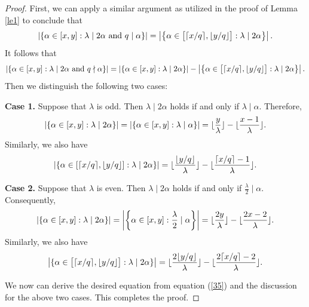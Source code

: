 \documentclass[10pt,a4paper]{amsart}
\begin{document}
\begin{proof}
First, we can apply a similar argument as utilized in the proof of Lemma \ref{le1} to conclude that 
    \begin{equation}\notag
   \left|  \{\alpha\in [x,y]:\lambda\mid 2\alpha \hbox{ and }q\mid \alpha \}\right|=\left| \left\{\alpha\in \big[\lceil {x}/{q}\rceil,\lfloor {y}/{q}\rfloor\big]: \lambda\mid 2\alpha\right\}\right|.
 \end{equation}
It follows that 
\begin{equation}\label{35}
    \left|  \{\alpha\in [x,y]:\lambda\mid 2\alpha \hbox{ and }q\nmid \alpha \}\right| =\left|  \{\alpha\in [x,y]:\lambda\mid 2\alpha \}\right|-\left| \left\{\alpha\in \big[\lceil {x}/{q}\rceil,\lfloor {y}/{q}\rfloor\big]: \lambda\mid 2\alpha\right\}\right|.
\end{equation}
Then we distinguish the   following two cases:

\textbf{Case 1.}
 Suppose that $\lambda$ is odd. Then $\lambda\mid 2\alpha$ holds if and only if $\lambda \mid \alpha.$ Therefore, 
\begin{equation}\notag
    \left|  \{\alpha\in [x,y]: \lambda\mid 2\alpha\}      \right| = \left| \{\alpha\in [x,y]: \lambda\mid \alpha\}   \right|=\lfloor\frac{y}{\lambda}\rfloor -\lfloor\frac{x-1}{\lambda} \rfloor.
\end{equation}
 Similarly, we also have 
\begin{equation}\notag
    \left|  \{\alpha\in [\lceil {x}/{q} \rceil, \lfloor {y}/{q} \rfloor]: \lambda\mid 2\alpha\}      \right| = \lfloor \frac{\lfloor y/q\rfloor}{\lambda}\rfloor-\lfloor \frac{\lceil {x}/{q} \rceil-1}{\lambda} \rfloor.
\end{equation}

\textbf{Case 2.} Suppose that $ \lambda$ is even. Then  $\lambda\mid 2\alpha$ holds if and only if $\frac{\lambda}{2}\mid \alpha$. Consequently, 
 \begin{equation}\notag
    \left|  \{\alpha\in [x,y]: \lambda\mid 2\alpha\}      \right| = \left| \left\{\alpha\in [x,y]: \frac{\lambda}{2} \mid \alpha\right\}   \right|=\lfloor\frac{2y}{\lambda}\rfloor -\lfloor\frac{2x-2}{\lambda} \rfloor.
\end{equation}
 Similarly, we also have 
\begin{equation}\notag
    \left|  \{\alpha \in \big[\lceil {x}/{q} \rceil, \lfloor 
{y}/{q} \rfloor\big]: \lambda\mid 2\alpha \}      \right| = \lfloor \frac{2\lfloor  y/q\rfloor}{\lambda}\rfloor-\lfloor \frac{2\lceil {x}/{q} \rceil-2}{\lambda} \rfloor.
\end{equation}

 We now can derive the desired equation 
from equation (\ref{35}) and the discussion for the above two cases.  This completes the proof. 
\end{proof}
\end{document}
